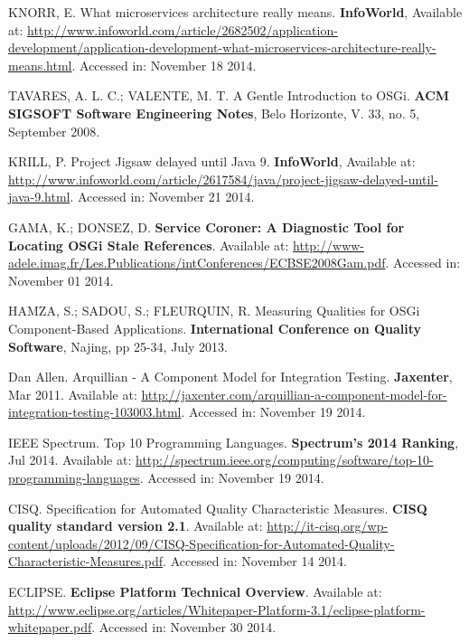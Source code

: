\documentclass[cic,tc,english]{iiufrgs} %
\begin{document}
\begin{thebibliography}{este-parametro-nao-eh-usado-pelo-estilo-ABNT}
 KNORR, E.
What microservices architecture really means. \textbf{InfoWorld}, Available at: \url{http://www.infoworld.com/article/2682502/application-development/application-development-what-microservices-architecture-really-means.html}. Accessed in: November 18 2014.

 TAVARES, A. L. C.; VALENTE, M. T.
A Gentle Introduction to OSGi. \textbf{ACM SIGSOFT Software Engineering Notes}, Belo Horizonte, V. 33, no. 5, September 2008. 

 KRILL, P.
Project Jigsaw delayed until Java 9. \textbf{InfoWorld}, Available at: \url{http://www.infoworld.com/article/2617584/java/project-jigsaw-delayed-until-java-9.html}. Accessed in: November 21 2014.

 GAMA, K.; DONSEZ, D.
\textbf{Service Coroner: A Diagnostic Tool for Locating OSGi Stale References}. Available at: \url{http://www-adele.imag.fr/Les.Publications/intConferences/ECBSE2008Gam.pdf}. Accessed in: November 01 2014.

 HAMZA, S.; SADOU, S.; FLEURQUIN, R.
Measuring Qualities for OSGi Component-Based Applications. \textbf{International Conference on Quality Software}, Najing, pp 25-34, July 2013.

 Dan Allen.
Arquillian - A Component Model for Integration Testing. \textbf{Jaxenter}, Mar 2011. 
Available at: \url{http://jaxenter.com/arquillian-a-component-model-for-integration-testing-103003.html}. Accessed in: November 19 2014.

 IEEE Spectrum.
Top 10 Programming Languages. \textbf{Spectrum’s 2014 Ranking}, Jul 2014. Available at: \url{http://spectrum.ieee.org/computing/software/top-10-programming-languages}. Accessed in: November 19 2014. 


 CISQ.
Specification for Automated Quality Characteristic Measures. \textbf{CISQ quality standard version 2.1}. Available at: \url{http://it-cisq.org/wp-content/uploads/2012/09/CISQ-Specification-for-Automated-Quality-Characteristic-Measures.pdf}. Accessed in: November 14 2014.

 ECLIPSE.
\textbf{Eclipse Platform Technical Overview}. Available at: \url{http://www.eclipse.org/articles/Whitepaper-Platform-3.1/eclipse-platform-whitepaper.pdf}. Accessed in: November 30 2014.


\end{thebibliography}
\end{document}
